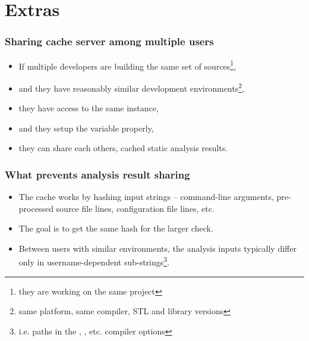 \documentclass[compress,table,xcolor=table]{beamer}
\begin{document}
\section{Extras}
\begin{frame}
  \Huge
\end{frame}
\begin{frame}
  \frametitle{Sharing cache server among multiple users}
  \Large
  \begin{itemize}
  \item If multiple developers are building the same set of sources\footnote{
      they are working on the same project},
  \item and they have reasonably similar development environments\footnote{
      same platform, same compiler, STL and library versions},
  \item they have access to the same  instance,
  \item and they setup the  variable properly,
  \item they can share each others, cached static analysis results.
  \end{itemize}
\end{frame}
\begin{frame}
  \frametitle{What prevents analysis result sharing}
  \Large
  \begin{itemize}
  \item The cache works by hashing input strings -- command-line arguments,
      pre-processed source file lines, configuration file lines, etc.
  \item The goal is to get the {\larger same hash} for the {larger  check}.
  \item Between users with similar environments, the analysis inputs typically
      differ only in {\larger username-dependent} sub-strings\footnote{
      i.e. paths in the , , etc. compiler options}.
  \end{itemize}
\end{frame}
\end{document}
